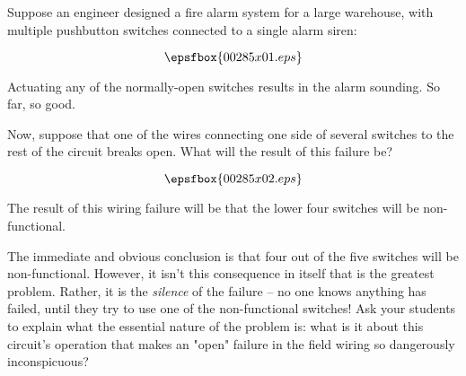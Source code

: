 

Suppose an engineer designed a fire alarm system for a large warehouse, with multiple pushbutton switches connected to a single alarm siren:

$$\epsfbox{00285x01.eps}$$

Actuating any of the normally-open switches results in the alarm sounding.  So far, so good.

Now, suppose that one of the wires connecting one side of several switches to the rest of the circuit breaks open.  What will the result of this failure be?

$$\epsfbox{00285x02.eps}$$







The result of this wiring failure will be that the lower four switches will be non-functional.







The immediate and obvious conclusion is that four out of the five switches will be non-functional.  However, it isn't this consequence in itself that is the greatest problem.  Rather, it is the {\it silence} of the failure -- no one knows anything has failed, until they try to use one of the non-functional switches!  Ask your students to explain what the essential nature of the problem is: what is it about this circuit's operation that makes an "open" failure in the field wiring so dangerously inconspicuous?




